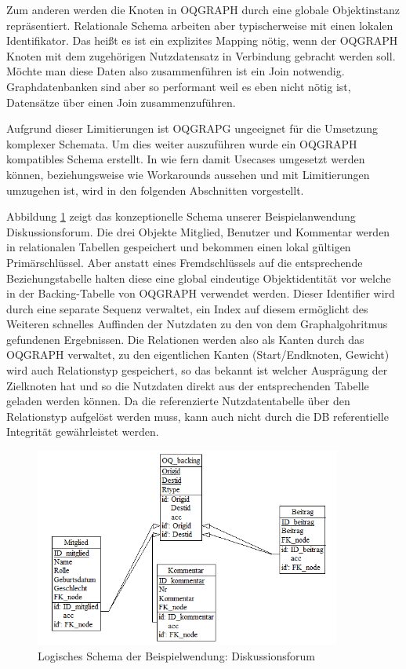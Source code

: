 Zum anderen werden die Knoten in OQGRAPH durch eine globale Objektinstanz repräsentiert. Relationale Schema arbeiten aber typischerweise mit einen lokalen Identifikator. Das heißt es ist ein explizites Mapping nötig, wenn der OQGRAPH Knoten mit dem zugehörigen Nutzdatensatz in Verbindung gebracht werden soll. Möchte man diese Daten also zusammenführen ist ein Join notwendig. Graphdatenbanken sind aber so performant weil es eben nicht nötig ist, Datensätze über einen Join zusammenzuführen.

Aufgrund dieser Limitierungen ist OQGRAPG ungeeignet für die Umsetzung komplexer Schemata. Um dies weiter auszuführen wurde ein OQGRAPH kompatibles Schema erstellt. In wie fern damit Usecases umgesetzt werden können, beziehungsweise wie Workarounds aussehen und mit Limitierungen umzugehen ist, wird in den folgenden Abschnitten vorgestellt.

Abbildung \ref{fig:logicSchema} zeigt das konzeptionelle Schema unserer Beispielanwendung Diskussionsforum. Die drei Objekte Mitglied, Benutzer und Kommentar werden in relationalen Tabellen gespeichert und bekommen einen lokal gültigen Primärschlüssel. Aber anstatt eines Fremdschlüssels auf die entsprechende Beziehungstabelle halten diese eine global eindeutige Objektidentität vor welche in der Backing-Tabelle von OQGRAPH verwendet werden. Dieser Identifier wird durch eine separate Sequenz verwaltet, ein Index auf diesem ermöglicht des Weiteren schnelles Auffinden der Nutzdaten zu den von dem Graphalgohritmus gefundenen Ergebnissen. Die Relationen werden also als Kanten durch das OQGRAPH verwaltet, zu den eigentlichen Kanten (Start/Endknoten, Gewicht) wird auch Relationstyp gespeichert, so das bekannt ist welcher Ausprägung der Zielknoten hat und so die Nutzdaten direkt aus der entsprechenden Tabelle geladen werden können. Da die referenzierte Nutzdatentabelle über den Relationstyp aufgelöst werden muss, kann auch nicht durch die DB referentielle 
Integrität gewährleistet werden.

\begin{figure}	
	\centering
	\includegraphics[width=0.9\textwidth]{images/logischesSchema.png}
	\caption{Logisches Schema der Beispielwendung: Diskussionsforum}
	\label{fig:logicSchema}
\end{figure}
 
